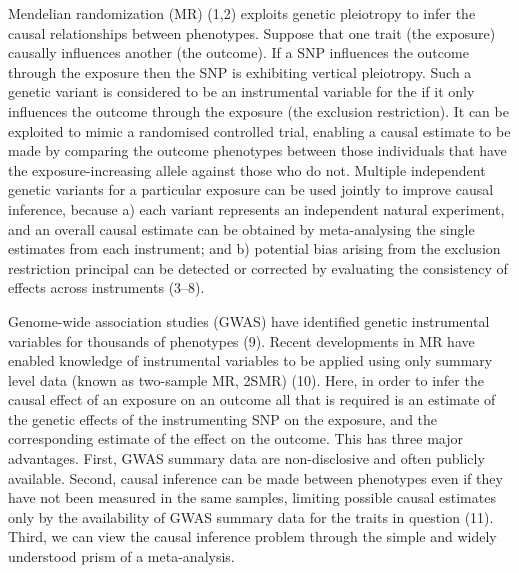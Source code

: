 \documentclass[]{article}
\begin{document}
Mendelian randomization (MR) (1,2) exploits genetic pleiotropy to infer
the causal relationships between phenotypes. Suppose that one trait (the
exposure) causally influences another (the outcome). If a SNP influences
the outcome through the exposure then the SNP is exhibiting vertical
pleiotropy. Such a genetic variant is considered to be an instrumental
variable for the if it only influences the outcome through the exposure
(the exclusion restriction). It can be exploited to mimic a randomised
controlled trial, enabling a causal estimate to be made by comparing the
outcome phenotypes between those individuals that have the
exposure-increasing allele against those who do not. Multiple
independent genetic variants for a particular exposure can be used
jointly to improve causal inference, because a) each variant represents
an independent natural experiment, and an overall causal estimate can be
obtained by meta-analysing the single estimates from each instrument;
and b) potential bias arising from the exclusion restriction principal
can be detected or corrected by evaluating the consistency of effects
across instruments (3--8).

Genome-wide association studies (GWAS) have identified genetic
instrumental variables for thousands of phenotypes (9). Recent
developments in MR have enabled knowledge of instrumental variables to
be applied using only summary level data (known as two-sample MR, 2SMR)
(10). Here, in order to infer the causal effect of an exposure on an
outcome all that is required is an estimate of the genetic effects of
the instrumenting SNP on the exposure, and the corresponding estimate of
the effect on the outcome. This has three major advantages. First, GWAS
summary data are non-disclosive and often publicly available. Second,
causal inference can be made between phenotypes even if they have not
been measured in the same samples, limiting possible causal estimates
only by the availability of GWAS summary data for the traits in question
(11). Third, we can view the causal inference problem through the simple
and widely understood prism of a meta-analysis.
\end{document}
